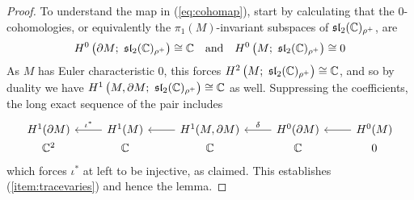 \documentclass[tikz, sepfignums, defaultenums]{nmd/article}
\newcommand{\slrhoplus}{\mathfrak{sl}_2(\C)_{\rho^+}}
\newcommand{\inc}{\iota}
\newcommand{\twisted}[3]{#1^#2\left(#3; \  \slrhoplus\right)}
\begin{document}
\begin{proof}
To understand the map in (\ref{eq:cohomap}), start by calculating that
the $0$\hyp cohomologies, or equivalently the $\pi_1(M)$-invariant
subspaces of $\slrhoplus$, are
\[
\twisted{H}{0}{\partial M} \cong \C \mtext{and} \twisted{H}{0}{M}
\cong 0
\]  
As $M$ has Euler characteristic $0$, this forces $\twisted{H}{2}{M}
\cong \C$, and so by duality we have $\twisted{H}{1}{M, \partial M}
\cong \C$ as well.  Suppressing the coefficients, the long exact
sequence of the pair includes
\[
\begin{tikzcd}
  H^1(\partial M) & \arrow{l}[above]{\inc^*} H^1(M)
  & \arrow{l} H^1(M, \partial M) & 
  \arrow{l}[above]{\delta}  H^0(\partial M) & \arrow{l} H^0(M) \\[-4.5ex]
  \C^2 & \C & \C & \C & 0
\end{tikzcd}
\]
which forces $\inc^*$ at left to be injective, as claimed.  This
establishes (\ref{item:tracevaries}) and hence the lemma. 
\end{proof}
\end{document}
